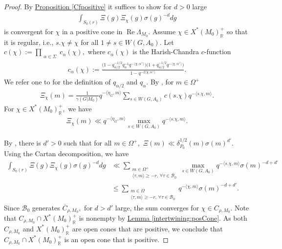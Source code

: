 \documentclass[10pt]{amsart}
\theoremstyle{definition}
\numberwithin{equation}{section}
\numberwithin{equation}{subsection}
\newcommand{\RR}{\mathbb{R}}
\newcommand{\calB}{\mathcal{B}}
\renewcommand{\Re}{\mathop{\mathrm{Re}}}
\begin{document}
\begin{proof}
    By \hyperref[Cfpositive]{Proposition \ref{Cfpositive}} it suffices to show for $d>0$ large
    \begin{align*}
        \int_{S_0(r)} \Xi(g)\Xi_\chi(g)\sigma(g)^{-d}dg
    \end{align*}
    is convergent for $\chi$ in a positive cone in $\Re\Lambda_{M_0}.$ Assume $\chi\in X^\ast(M_0)^+_\RR$ so that it is regular, i.e., $s.\chi\neq \chi$ for all $1\neq s\in W(G,A_0).$ Let $c(\chi):=\prod_{\substack{\alpha\in \Sigma}} c_\alpha(\chi),$ where $c_\alpha(\chi)$ is the Harish-Chandra $c$-function
\begin{align*}
    c_\alpha(\chi):=\frac{\big(1-q_{\alpha/2}^{-1/2}q_\alpha^{-1}q^{-\langle \chi,\alpha^\lor\rangle}\big)\big(1+q^{-1/2}_{\alpha/2}q^{-\langle \chi,\alpha^\lor\rangle}\big)}{1-q^{-2\langle \chi,\alpha^\lor\rangle}}.
\end{align*}
We refer one to \cite[\S 1]{Casselman:unramifiedI} for the definition of $q_{\alpha/2}$ and $q_{\alpha}.$ By \cite[Theorem 4.2]{Casselman:unramifiedI}, for $m\in \Omega^+$
\begin{align*}
    \Xi_{\chi}(m)=\frac{1}{\gamma(G|M_0)}q^{-\langle \eta_G,m\rangle}\sum_{s\in W(G,A_0)} c(s.\chi)q^{-\langle s.\chi,m\rangle}.
\end{align*}
For $\chi\in X^\ast(M_0)_\RR^+,$ we have
\begin{align*}
    \Xi_\chi(m)\ll  q^{-\langle\eta_G,m\rangle}\max_{s\in W(G,A_0)}q^{-\langle s.\chi,m\rangle}.
\end{align*}

 By \cite[Lemme II.1.1]{Waldspurger:Plancherel}, there is $d'>0$ such that for all $m\in \Omega^+,$ $\Xi(m)\ll \delta^{1/2}_{P_0}(m)\sigma(m)^{d'}.$ Using the Cartan decomposition, we have
    \begin{align*}
         \int_{S_0(r)} \Xi(g)\Xi_\chi(g)\sigma(g)^{-d}dg&\ll \sum_{\substack{m\in \Omega^+\\
        \langle \tau,m\rangle\ge -r, \,\forall\tau\in \calB_0}} \max_{s\in W(G,A_0)}q^{-\langle s.\chi,m\rangle}\sigma(m)^{-d+d'}\\
        &\le \sum_{\substack{m\in \Omega\\
        \langle \tau,m\rangle\ge -r, \,\forall\tau\in \calB_0}} q^{-\langle \chi,m\rangle}\sigma(m)^{-d+d'}.
    \end{align*}
     Since $\calB_0$ generates $\overline{C}_{\rho,M_0},$ for $d>d'$ large, the sum converges for $\chi\in C_{\rho,M_0}$. Note that $C_{\rho,M_0}\cap X^\ast(M_0)_\RR^+$ is nonempty by \hyperref[intertwining:posCone]{Lemma \ref{intertwining:posCone}}. As both $C_{\rho,M_0}$ and $X^\ast(M_0)_\RR^+$ are open cones that are positive, we conclude that $C_{\rho,M_0}\cap X^\ast(M_0)_\RR^+$ is an open cone that is positive. 
\end{proof}
\end{document}
